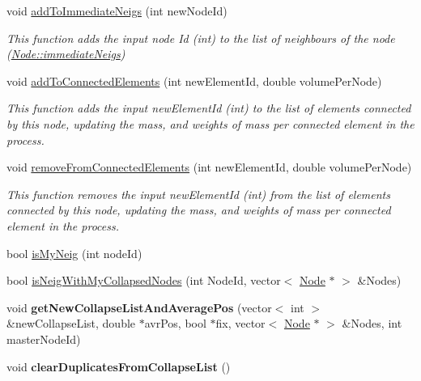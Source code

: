 \begin{DoxyCompactItemize}
\item 
void \hyperlink{classNode_ac2838f50304007a7cfe3df3f2e8d1772}{add\+To\+Immediate\+Neigs} (int new\+Node\+Id)
\begin{DoxyCompactList}\small\item\em This function adds the input node Id (int) to the list of neighbours of the node (\hyperlink{classNode_ab22060fb9f61a0d93ec52e6045828782}{Node\+::immediate\+Neigs}) \end{DoxyCompactList}\item 
void \hyperlink{classNode_a2c6f029aa3388b8fb122139b1d24b71b}{add\+To\+Connected\+Elements} (int new\+Element\+Id, double volume\+Per\+Node)
\begin{DoxyCompactList}\small\item\em This function adds the input new\+Element\+Id (int) to the list of elements connected by this node, updating the mass, and weights of mass per connected element in the process. \end{DoxyCompactList}\item 
void \hyperlink{classNode_a6dc9c26deadb9d2ca3e248f4748d9dfc}{remove\+From\+Connected\+Elements} (int new\+Element\+Id, double volume\+Per\+Node)
\begin{DoxyCompactList}\small\item\em This function removes the input new\+Element\+Id (int) from the list of elements connected by this node, updating the mass, and weights of mass per connected element in the process. \end{DoxyCompactList}\item 
bool \hyperlink{classNode_abc1e7e6c42b377c073a68c2b2ea97fa8}{is\+My\+Neig} (int node\+Id)
\item 
bool \hyperlink{classNode_a5fcd3b2e58e0cdfd817371269494e1de}{is\+Neig\+With\+My\+Collapsed\+Nodes} (int Node\+Id, vector$<$ \hyperlink{classNode}{Node} $\ast$ $>$ \&Nodes)
\item 
\hypertarget{classNode_a7d04a300d7a019d11183776a05e34d97}{}void {\bfseries get\+New\+Collapse\+List\+And\+Average\+Pos} (vector$<$ int $>$ \&new\+Collapse\+List, double $\ast$avr\+Pos, bool $\ast$fix, vector$<$ \hyperlink{classNode}{Node} $\ast$ $>$ \&Nodes, int master\+Node\+Id)\label{classNode_a7d04a300d7a019d11183776a05e34d97}

\item 
\hypertarget{classNode_a7256e876aa188a55e16ef5df1aa89c0f}{}void {\bfseries clear\+Duplicates\+From\+Collapse\+List} ()\label{classNode_a7256e876aa188a55e16ef5df1aa89c0f}


\end{DoxyCompactItemize}

